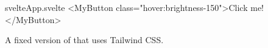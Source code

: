 \begin{listing}[H]
\begin{myminted}{svelte}{App.svelte}
  <MyButton class="hover:brightness-150">Click me!</MyButton>
\end{myminted}
\caption{A fixed version of  that uses Tailwind CSS.}
\label{fig:evaluation-styling-tailwind}
\end{listing}






